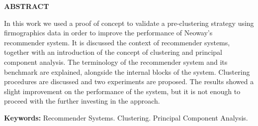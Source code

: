 \thispagestyle{plain}

\begin{center}
	\textbf{ABSTRACT}
\end{center}

\bigskip

In this work we used a proof of concept to validate a pre-clustering strategy using firmographics data in order to improve the performance of Neoway's recommender system. It is discussed the context of recommender systems, together with an introduction of the concept of clustering and principal component analysis. The terminology of the recommender system and its benchmark are explained, alongside the internal blocks of the system. Clustering procedures are discussed and two experiments are proposed. The results showed a slight improvement on the performance of the system, but it is not enough to proceed with the further investing in the approach.

\textbf{Keywords:} Recommender Systems. Clustering. Principal Component Analysis.